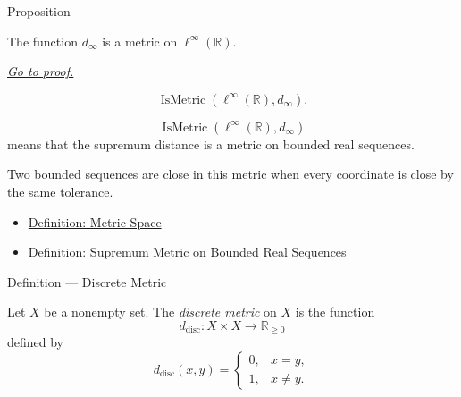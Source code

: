 \begin{propositionbox}{Proposition}
\begin{proposition}
\label{prop:bounded-real-sequence-space-sup-metric}
The function \(d_\infty\) is a metric on \(\ell^\infty(\mathbb{R})\).

\smallskip
\noindent
\hyperref[prf:bounded-real-sequence-space-sup-metric]{\textit{Go to proof.}}
\end{proposition}
\end{propositionbox}

\begin{remark*}
\[
  \operatorname{IsMetric}(\ell^\infty(\mathbb{R}),d_\infty).
\]
\end{remark*}

\begin{remark*}
\[
\operatorname{IsMetric}(\ell^\infty(\mathbb{R}),d_\infty)
\]
means that the supremum distance is a metric on bounded real sequences.
\end{remark*}

\begin{remark*}[Interpretation]
Two bounded sequences are close in this metric when every coordinate is close
by the same tolerance.
\end{remark*}

\begin{dependencies}
\begin{itemize}
  \item \hyperref[def:metric-space]{Definition: Metric Space}
  \item \hyperref[def:bounded-real-sequence-space]{Definition: Supremum Metric on Bounded Real Sequences}
\end{itemize}
\end{dependencies}

\begin{definitionbox}{Definition --- Discrete Metric}
\begin{definition}\label{def:discrete-metric}
Let \(X\) be a nonempty set.  The \emph{discrete metric} on \(X\) is the
function
\[
  d_{\mathrm{disc}}:X\times X\to\mathbb{R}_{\geq 0}
\]
defined by
\[
  d_{\mathrm{disc}}(x,y)
  =
  \begin{cases}
    0, & x=y,\\
    1, & x\neq y.
  \end{cases}
\]
\end{definition}
\end{definitionbox}

